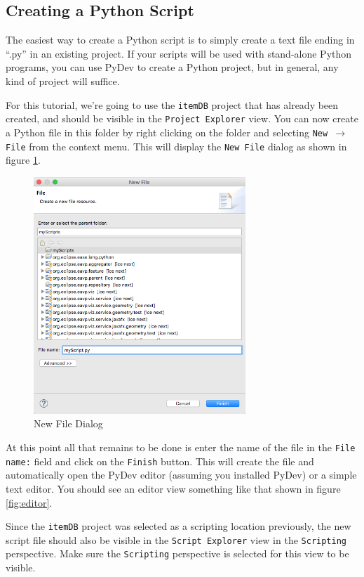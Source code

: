 \subsection{Creating a Python Script}

The easiest way to create a Python script is to simply create a text file ending
in ``.py'' in an existing project. If your scripts will be used with stand-alone Python
programs, you can use PyDev to create a Python project, but in general, any kind
of project will suffice.

For this tutorial, we're going to use the \texttt{itemDB} project that has
already been created, and should be visible in the \texttt{Project Explorer}
view. You can now create a Python file in this folder by right clicking on the
folder and selecting \texttt{New $\rightarrow$ File} from the context menu. 
This will display the \texttt{New File} dialog as shown in figure \ref{fig:newfile}.

\begin{figure}[!ht]
\centering
\includegraphics[width=8cm]{images/newfile}
\caption{New File Dialog}
\label{fig:newfile}
\end{figure}

At this point all that remains to be done is enter the name of the file in the
\texttt{File name:} field and click on the \texttt{Finish} button. This will
create the file and automatically open the PyDev editor (assuming you installed
PyDev) or a simple text editor. You should see an editor view something like
that shown in figure \ref{fig:editor}.

Since the \texttt{itemDB} project was selected as a scripting location
previously, the new script file should also be visible in the \texttt{Script
Explorer} view in the \texttt{Scripting} perspective. Make sure the
\texttt{Scripting} perspective is selected for this view to be visible.

